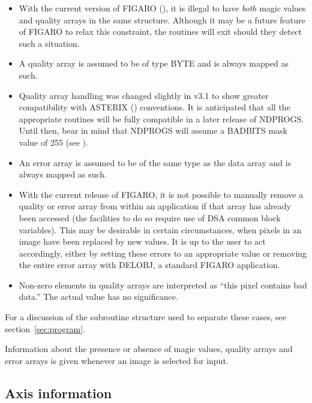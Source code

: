 \begin{itemize} 

\item With the current version of FIGARO (), 
it is illegal to have {\em
both} magic values and quality arrays in the same structure. Although
it may be a future feature of FIGARO to relax this constraint, the
routines will exit should they detect such a situation.

\item A quality array is assumed to be of type BYTE and is always
mapped as such.

\item Quality array handling was changed slightly in v3.1 to show
greater compatibility with ASTERIX () conventions. It is anticipated that
all the appropriate routines will be fully compatible in a later
release of NDPROGS.  Until then, bear in mind that NDPROGS will assume
a BADBITS mask value of 255 (see ).

\item An error array is assumed to be of the same type as the data
array and is always mapped as such.

\item With the current release of FIGARO, it is not possible to
manually remove a quality or error array from within an application if
that array has already been accessed (the facilities to do so require
use of DSA common block variables). This may be desirable in certain
circumstances, when pixels in an image have been replaced by new
values.  It is up to the user to act accordingly, either by setting
these errors to an appropriate value or removing the entire error array
with DELOBJ, a standard FIGARO application.

\item Non-zero elements in quality arrays are interpreted as ``this
pixel contains bad data.'' The actual value has no significance.

\end{itemize} 

For a discussion of the subroutine structure used to separate these
cases, see section~\ref{sec:program}.

Information about the presence or absence of magic values, quality
arrays and error arrays is given whenever an image is selected for
input.

\subsection{Axis information}


